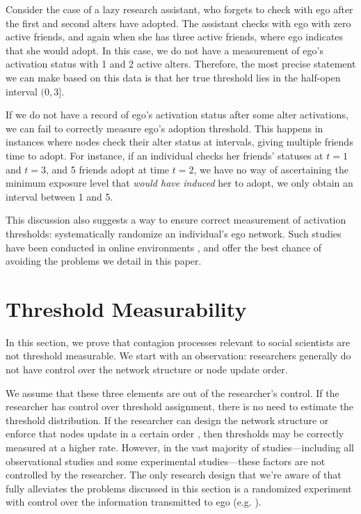 \documentclass[a4paper]{article}
\begin{document}
Consider the case of a lazy research assistant, who forgets to check with ego after the first and second alters have adopted. The assistant checks with ego with zero active friends, and again when she has three active friends, where ego indicates that she would adopt. In this case, we do not have a measurement of ego's activation status with 1 and 2 active alters. Therefore, the most precise statement we can make based on this data is that her true threshold lies in the half-open interval $(0, 3]$.

If we do not have a record of ego's activation status after some alter activations, we can fail to correctly measure ego's adoption threshold. This happens in instances where nodes check their alter status at intervals, giving multiple friends time to adopt. For instance, if an individual checks her friends' statuses at $t = 1$ and $t = 3$, and 5 friends adopt at time $t = 2$, we have no way of ascertaining the minimum exposure level that \emph{would have induced} her to adopt, we only obtain an interval between 1 and 5.

This discussion also suggests a way to ensure correct measurement of activation thresholds: systematically randomize an individual's ego network. Such studies have been conducted in online environments \parencite{Aral2008, Bakshy2011}, and offer the best chance of avoiding the problems we detail in this paper.

\section{Threshold Measurability}

In this section, we prove that contagion processes relevant to social scientists are not threshold measurable. We start with an observation: researchers generally do not have control over the network structure or node update order.

We assume that these three elements are out of the researcher's control. If the researcher has control over threshold assignment, there is no need to estimate the threshold distribution. If the researcher can design the network structure \parencite{centola} or enforce that nodes update in a certain order \parencite{tsvetkova}, then thresholds may be correctly measured at a higher rate. However, in the vast majority of studies---including all observational studies and some experimental studies---these factors are not controlled by the researcher. The only research design that we're aware of that fully alleviates the problems discussed in this section is a randomized experiment with control over the information transmitted to ego (e.g. \cite{bakshy}).
\end{document}
